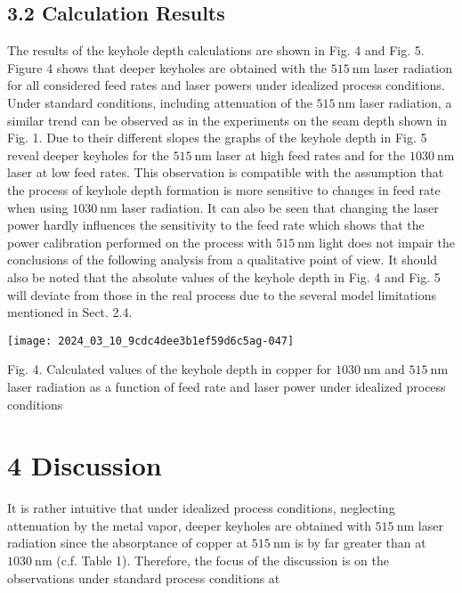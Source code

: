 \documentclass[10pt]{article}
\begin{document}
\subsection*{3.2 Calculation Results}
The results of the keyhole depth calculations are shown in Fig. 4 and Fig. 5. Figure 4 shows that deeper keyholes are obtained with the $515 \mathrm{~nm}$ laser radiation for all considered feed rates and laser powers under idealized process conditions. Under standard conditions, including attenuation of the $515 \mathrm{~nm}$ laser radiation, a similar trend can be observed as in the experiments on the seam depth shown in Fig. 1. Due to their different slopes the graphs of the keyhole depth in Fig. 5 reveal deeper keyholes for the $515 \mathrm{~nm}$ laser at high feed rates and for the $1030 \mathrm{~nm}$ laser at low feed rates. This observation is compatible with the assumption that the process of keyhole depth formation is more sensitive to changes in feed rate when using $1030 \mathrm{~nm}$ laser radiation. It can also be seen that changing the laser power hardly influences the sensitivity to the feed rate which shows that the power calibration performed on the process with $515 \mathrm{~nm}$ light does not impair the conclusions of the following analysis from a qualitative point of view. It should also be noted that the absolute values of the keyhole depth in Fig. 4 and Fig. 5 will deviate from those in the real process due to the several model limitations mentioned in Sect. 2.4.

\begin{center}
\texttt{[image: 2024\_03\_10\_9cdc4dee3b1ef59d6c5ag-047]}
\end{center}

Fig. 4. Calculated values of the keyhole depth in copper for $1030 \mathrm{~nm}$ and $515 \mathrm{~nm}$ laser radiation as a function of feed rate and laser power under idealized process conditions

\section*{4 Discussion}
It is rather intuitive that under idealized process conditions, neglecting attenuation by the metal vapor, deeper keyholes are obtained with $515 \mathrm{~nm}$ laser radiation since the absorptance of copper at $515 \mathrm{~nm}$ is by far greater than at $1030 \mathrm{~nm}$ (c.f. Table 1). Therefore, the focus of the discussion is on the observations under standard process conditions at
\end{document}

